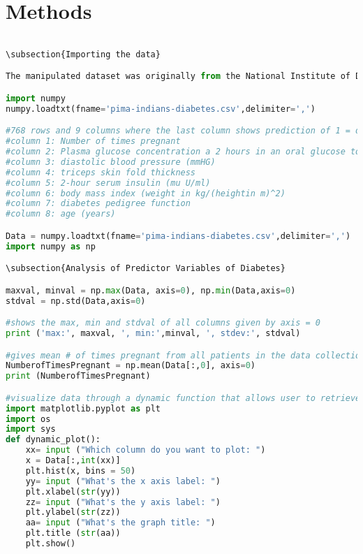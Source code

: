\documentclass [letterpaper]{article}
\begin{document}
\section{Methods}

\begin{lstlisting}[language=Python]

\subsection{Importing the data}

The manipulated dataset was originally from the National Institute of Diabetes and Digestive and Kidney Diseases. All patients that data was recorded from are all females of at least 21 years old and of Pima Indian Heritage.

import numpy
numpy.loadtxt(fname='pima-indians-diabetes.csv',delimiter=',')

#768 rows and 9 columns where the last column shows prediction of 1 = diabetes and 0 = no diabetes
#column 1: Number of times pregnant
#column 2: Plasma glucose concentration a 2 hours in an oral glucose tolerance test
#column 3: diastolic blood pressure (mmHG)
#column 4: triceps skin fold thickness
#column 5: 2-hour serum insulin (mu U/ml)
#column 6: body mass index (weight in kg/(heightin m)^2)
#column 7: diabetes pedigree function
#column 8: age (years)

Data = numpy.loadtxt(fname='pima-indians-diabetes.csv',delimiter=',')
import numpy as np

\subsection{Analysis of Predictor Variables of Diabetes}

maxval, minval = np.max(Data, axis=0), np.min(Data,axis=0)
stdval = np.std(Data,axis=0)

#shows the max, min and stdval of all columns given by axis = 0
print ('max:', maxval, ', min:',minval, ', stdev:', stdval)

#gives mean # of times pregnant from all patients in the data collection
NumberofTimesPregnant = np.mean(Data[:,0], axis=0)
print (NumberofTimesPregnant)

#visualize data through a dynamic function that allows user to retrieve data they choose to compare
import matplotlib.pyplot as plt
import os
import sys
def dynamic_plot(): 
    xx= input ("Which column do you want to plot: ")
    x = Data[:,int(xx)]
    plt.hist(x, bins = 50)
    yy= input ("What's the x axis label: ")
    plt.xlabel(str(yy))
    zz= input ("What's the y axis label: ")
    plt.ylabel(str(zz))
    aa= input ("What's the graph title: ")
    plt.title (str(aa))
    plt.show()


\end{lstlisting}
\end{document}
